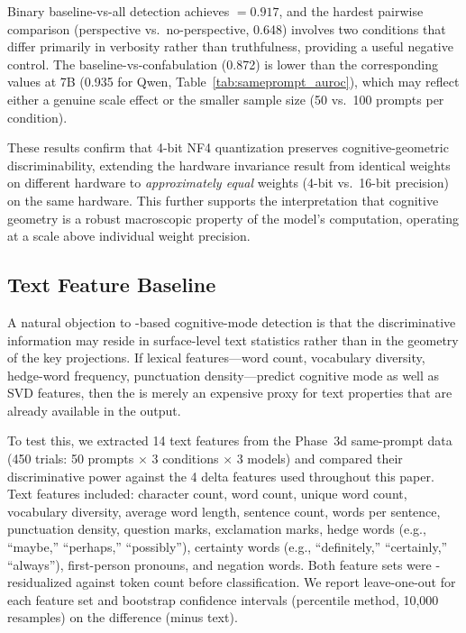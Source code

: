 \noindent Binary baseline-vs-all detection achieves \auroc $= 0.917$, and the hardest pairwise comparison (perspective vs.\ no-perspective, 0.648) involves two conditions that differ primarily in verbosity rather than truthfulness, providing a useful negative control.
The baseline-vs-confabulation \auroc (0.872) is lower than the corresponding values at 7B (0.935 for Qwen, Table~\ref{tab:sameprompt_auroc}), which may reflect either a genuine scale effect or the smaller sample size (50 vs.\ 100 prompts per condition).

These results confirm that 4-bit NF4 quantization preserves cognitive-geometric discriminability, extending the hardware invariance result from identical weights on different hardware to \emph{approximately equal} weights (4-bit vs.\ 16-bit precision) on the same hardware.
This further supports the interpretation that cognitive geometry is a robust macroscopic property of the model's computation, operating at a scale above individual weight precision.

\subsection{Text Feature Baseline}
\label{sec:text_baseline}

A natural objection to \kvcache-based cognitive-mode detection is that the discriminative information may reside in surface-level text statistics rather than in the geometry of the key projections.
If lexical features---word count, vocabulary diversity, hedge-word frequency, punctuation density---predict cognitive mode as well as SVD features, then the \kvcache is merely an expensive proxy for text properties that are already available in the output.

To test this, we extracted 14 text features from the Phase~3d same-prompt data (450 trials: 50 prompts $\times$ 3 conditions $\times$ 3 models) and compared their discriminative power against the 4 \kvcache delta features used throughout this paper.
Text features included: character count, word count, unique word count, vocabulary diversity, average word length, sentence count, words per sentence, punctuation density, question marks, exclamation marks, hedge words (e.g., ``maybe,'' ``perhaps,'' ``possibly''), certainty words (e.g., ``definitely,'' ``certainly,'' ``always''), first-person pronouns, and negation words.
Both feature sets were \fwl-residualized against token count before classification.
We report leave-one-out \auroc for each feature set and bootstrap confidence intervals (percentile method, 10{,}000 resamples) on the difference (\kvcache minus text).

